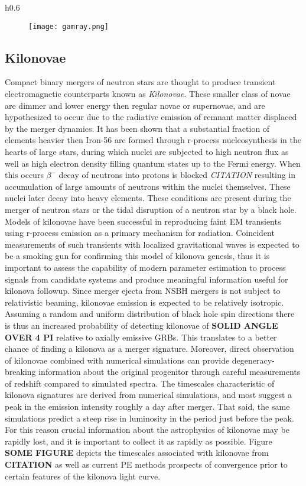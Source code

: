 \documentclass[paper=a4, fontsize=11pt]{scrartcl} %
\numberwithin{equation}{section} %
\numberwithin{figure}{section} %
\numberwithin{table}{section} %
\begin{document}
\begin{wrapfigure}{h}{0.6\textwidth}
\begin{figure}[H!]
\hspace{-0.5cm}
\texttt{[image: gamray.png]}
\end{figure}

\subsection{Kilonovae}
Compact binary mergers of neutron stars are thought to produce transient electromagnetic counterparts known as \textit{Kilonovae}. These smaller class of novae are dimmer and lower energy then regular novae or supernovae, and are hypothesized to occur due to the radiative emission of remnant matter displaced by the merger dynamics. It has been shown that a substantial fraction of elements heavier then Iron-56 are formed through r-process nucleosynthesis in the hearts of large stars, during which nuclei are subjected to high neutron flux as well as high electron density filling quantum states up to the Fermi energy. When this occurs $\beta^-$ decay of neutrons into protons is blocked \textit{CITATION} resulting in accumulation of large amounts of neutrons within the nuclei themselves. These nuclei later decay into heavy elements. These conditions are present during the merger of neutron stars or the tidal disruption of a neutron star by a black hole. Models of kilonovae have been successful in reproducing faint EM transients using r-process emission as a primary mechanism for radiation. Coincident measurements of such transients with localized gravitational waves is expected to be a smoking gun for confirming this model of kilonova genesis, thus it is important to assess the capability of modern parameter estimation to process signals from candidate systems and produce meaningful information useful for kilonova followup. 
Since merger ejecta from NSBH mergers is not subject to relativistic beaming, kilonovae emission is expected to be relatively isotropic. Assuming a random and uniform distribution of black hole spin directions there is thus an increased probability of detecting kilonovae of \textbf{SOLID ANGLE OVER 4 PI} relative to axially emissive GRBs. This translates to a better chance of finding a kilonova as a merger signature. Moreover, direct observation of kilonovae combined with numerical simulations can provide degeneracy-breaking information about the original progenitor through careful measurements of redshift compared to simulated spectra.   
The timescales characteristic of kilonova signatures are derived from numerical simulations, and most suggest a peak in the emission intensity roughly a day after merger. That said, the same simulations predict a steep rise in luminosity in the period just before the peak. For this reason crucial information about the astrophysics of kilonovae may be rapidly lost, and it is important to collect it as rapidly as possible. Figure \textbf{SOME FIGURE} depicts the timescales associated with kilonovae from \textbf{CITATION} as well as current PE methods prospects of convergence prior to certain features of the kilonova light curve.


\end{wrapfigure}
\end{document}
